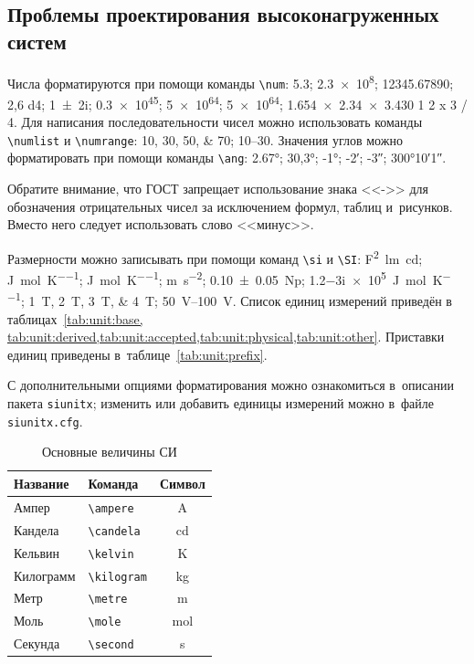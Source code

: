 \subsection{Проблемы проектирования высоконагруженных систем}\label{sec:units}

Числа форматируются при помощи команды \verb|\num|:
\num{5,3};
\num{2,3e8};
\num{12345,67890};
\num{2,6 d4};
\num{1+-2i};
\num{.3e45};
\num[exponent-base=2]{5 e64};
\num[exponent-base=2,exponent-to-prefix]{5 e64};
\num{1.654 x 2.34 x 3.430}
\num{1 2 x 3 / 4}.
Для написания последовательности чисел можно использовать команды \verb|\numlist| и \verb|\numrange|:
\numlist{10;30;50;70}; \numrange{10}{30}.
Значения углов можно форматировать при помощи команды \verb|\ang|:
\ang{2.67};
\ang{30,3};
\ang{-1;;};
\ang{;-2;};
\ang{;;-3};
\ang{300;10;1}.

Обратите внимание, что ГОСТ запрещает использование знака <<->> для обозначения отрицательных чисел
за исключением формул, таблиц и~рисунков.
Вместо него следует использовать слово <<минус>>.

Размерности можно записывать при помощи команд \verb|\si| и \verb|\SI|:
\si{\farad\squared\lumen\candela};
\si{\joule\per\mole\per\kelvin};
\si[per-mode = symbol-or-fraction]{\joule\per\mole\per\kelvin};
\si{\metre\per\second\squared};
\SI{0.10(5)}{\neper};
\SI{1.2-3i e5}{\joule\per\mole\per\kelvin};
\SIlist{1;2;3;4}{\tesla};
\SIrange{50}{100}{\volt}.
Список единиц измерений приведён в таблицах~\cref{tab:unit:base,
    tab:unit:derived,tab:unit:accepted,tab:unit:physical,tab:unit:other}.
Приставки единиц приведены в~таблице~\cref{tab:unit:prefix}.

С дополнительными опциями форматирования можно ознакомиться в~описании пакета \texttt{siunitx};
изменить или добавить единицы измерений можно в~файле \texttt{siunitx.cfg}.

\begin{table}
    \centering
    \captionsetup{justification=centering} %
    \caption{Основные величины СИ}\label{tab:unit:base}
    \begin{tabular}{llc}
        \toprule
        Название  & Команда                 & Символ         \\
        \midrule
        Ампер     & \verb|\ampere| & \si{\ampere}   \\
        Кандела   & \verb|\candela| & \si{\candela}  \\
        Кельвин   & \verb|\kelvin| & \si{\kelvin}   \\
        Килограмм & \verb|\kilogram| & \si{\kilogram} \\
        Метр      & \verb|\metre| & \si{\metre}    \\
        Моль      & \verb|\mole| & \si{\mole}     \\
        Секунда   & \verb|\second| & \si{\second}   \\
        \bottomrule
    \end{tabular}
\end{table}

